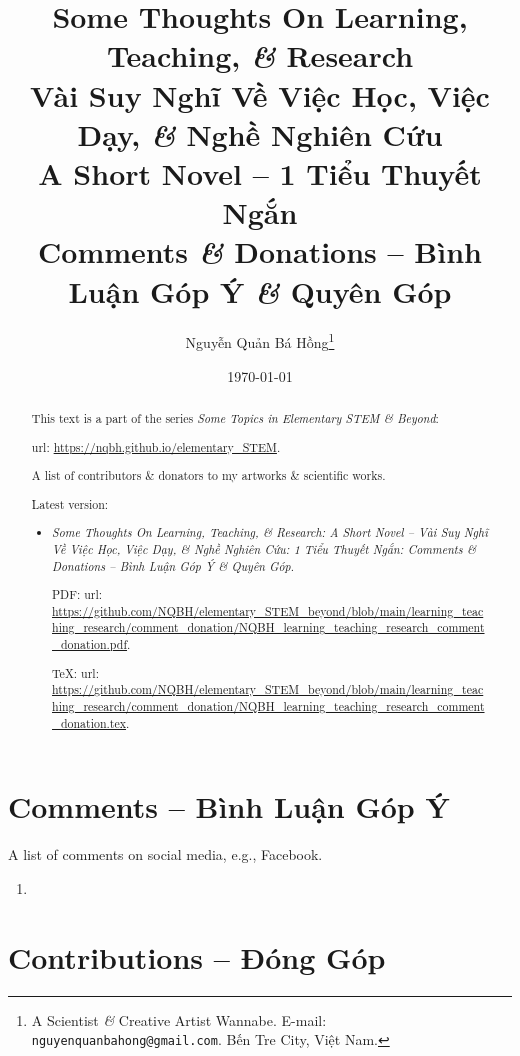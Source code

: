 \documentclass{article}
\title{Some Thoughts On Learning, Teaching, {\it\&} Research\\Vài Suy Nghĩ Về Việc Học, Việc Dạy, {\it\&} Nghề Nghiên Cứu\\{\Large\sf A Short Novel -- 1 Tiểu Thuyết Ngắn}\\Comments {\it\&} Donations -- Bình Luận Góp Ý {\it\&} Quyên Góp}
\author{Nguyễn Quản Bá Hồng\footnote{A Scientist {\it\&} Creative Artist Wannabe. E-mail: {\tt nguyenquanbahong@gmail.com}. Bến Tre City, Việt Nam.}}
\date{\today}
\begin{document}
\maketitle
\begin{abstract}
	This text is a part of the series {\it Some Topics in Elementary STEM \& Beyond}:
	
	{\sc url}: \url{https://nqbh.github.io/elementary_STEM}.
	
	A list of contributors \& donators to my artworks \& scientific works.
	
	Latest version:
	\begin{itemize}
		\item {\it Some Thoughts On Learning, Teaching, \& Research: A Short Novel -- Vài Suy Nghĩ Về Việc Học, Việc Dạy, \& Nghề Nghiên Cứu: 1 Tiểu Thuyết Ngắn: Comments \& Donations -- Bình Luận Góp Ý \& Quyên Góp}.
		
		PDF: {\sc url}: \url{https://github.com/NQBH/elementary_STEM_beyond/blob/main/learning_teaching_research/comment_donation/NQBH_learning_teaching_research_comment_donation.pdf}.
		
		\TeX: {\sc url}: \url{https://github.com/NQBH/elementary_STEM_beyond/blob/main/learning_teaching_research/comment_donation/NQBH_learning_teaching_research_comment_donation.tex}.
	\end{itemize}
\end{abstract}
\tableofcontents


\section{Comments -- Bình Luận Góp Ý}
A list of comments on social media, e.g., Facebook.
\begin{enumerate}
	\item 
\end{enumerate}

\section{Contributions -- Đóng Góp}
\end{document}
